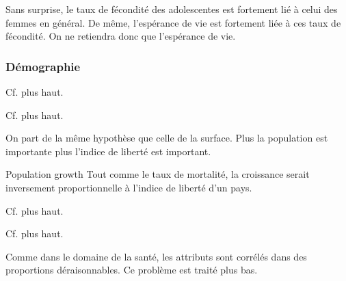 Sans surprise, le taux de fécondité des adolescentes est fortement lié à celui des femmes en général. De même, l'espérance de vie est fortement liée à ces taux de fécondité. On ne retiendra donc que l'espérance de vie.

\subsubsection{Démographie} 
\begin{description}
\item [Fertility rate]
Cf. plus haut.
\item [Adolescent fertility]
Cf. plus haut.
\item [Population totale]
On part de la même hypothèse que celle de la surface. Plus la population est importante plus l'indice de liberté est important.
\item Population growth
Tout comme le taux de mortalité, la croissance serait inversement proportionnelle à l'indice de liberté d'un pays.
\item [Life expectancy]
Cf. plus haut.
\item [Surface]
Cf. plus haut.
\end{description}

Comme dans le domaine de la santé, les attributs sont corrélés dans des proportions déraisonnables. Ce problème est traité plus bas.

